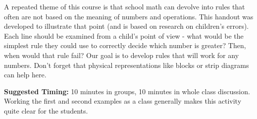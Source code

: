 \documentclass{ximera}
\begin{document}
\newpage
\begin{instructorNotes}
A repeated theme of this course is that school math can devolve into rules that often are not based on the meaning of numbers and operations.  This handout was developed to illustrate that point (and is based on research on children's errors).  Each line should be examined from a child's point of view - what would be the simplest rule they could use to correctly decide which number is greater? Then, when would that rule fail? Our goal is to develop rules that will work for any numbers.  Don't forget that physical representations like blocks or strip diagrams can help here.


{\bf Suggested Timing:} 10 minutes in groups, 10 minutes in whole class discussion.  Working the first and second examples as a class generally makes this activity quite clear for the students.
\end{instructorNotes}
\end{document}

